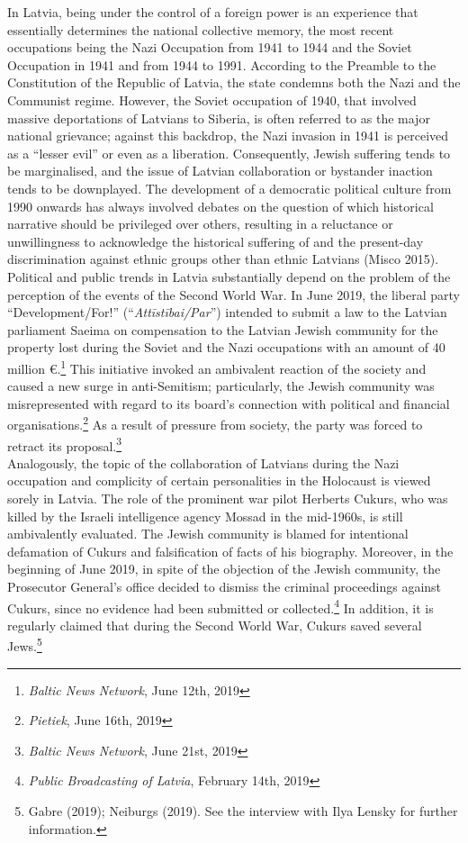 In Latvia, being under the control of a foreign power is an experience that essentially determines the national collective memory, the most recent occupations being the Nazi Occupation from 1941 to 1944 and the Soviet Occupation in 1941 and from 1944 to 1991. According to the Preamble to the Constitution of the Republic of Latvia, the state condemns both the Nazi and the Communist regime. However, the Soviet occupation of 1940, that involved massive deportations of Latvians to Siberia, is often referred to as the major national grievance; against this backdrop, the Nazi invasion in 1941 is perceived as a “lesser evil” or even as a liberation. Consequently, Jewish suffering tends to be marginalised, and the issue of Latvian collaboration or bystander inaction tends to be downplayed. The development of a democratic political culture from 1990 onwards has always involved debates on the question of which historical narrative should be privileged over others, resulting in a reluctance or unwillingness to acknowledge the historical suffering of and the present-day discrimination against ethnic groups other than ethnic Latvians (Misco 2015). \\
Political and public trends in Latvia substantially depend on the problem of the perception of the events of the Second World War. In June 2019, the liberal party ``Development/For!'' (``\textit{Attīstībai/Par}'') intended to submit a law to the Latvian parliament Saeima on compensation to the Latvian Jewish community for the property lost during the Soviet and the Nazi occupations with an amount of 40 million \euro{}.\footnote{\textit{Baltic News Network}, June 12th, 2019} This initiative invoked an ambivalent reaction of the society and caused a new surge in anti-Semitism; particularly, the Jewish community was misrepresented with regard to its board’s connection with political and financial organisations.\footnote{\textit{Pietiek}, June 16th, 2019} As a result of pressure from society, the party was forced to retract its proposal.\footnote{\textit{Baltic News Network}, June 21st, 2019}\\  
Analogously, the topic of the collaboration of Latvians during the Nazi occupation and complicity of certain personalities in the Holocaust is viewed sorely in Latvia. The role of the prominent war pilot Herberts Cukurs, who was killed by the Israeli intelligence agency Mossad in the mid-1960s, is still ambivalently evaluated. The Jewish community is blamed for intentional defamation of Cukurs and falsification of facts of his biography. Moreover, in the beginning of June 2019, in spite of the objection of the Jewish community, the Prosecutor General's office decided to dismiss the criminal proceedings against Cukurs, since no evidence had been submitted or collected.\footnote{\textit{Public Broadcasting of Latvia}, February 14th, 2019} In addition, it is regularly claimed that during the Second World War, Cukurs saved several Jews.\footnote{Gabre (2019); Neiburgs (2019). See the interview with Ilya Lensky for further information.}\\
